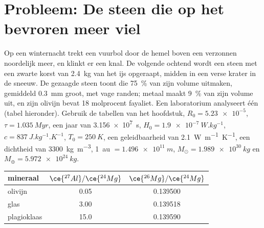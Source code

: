 \section{Probleem: De steen die op het bevroren meer viel}

\begin{problem}
\label{pb:b2:planet-formation-meteorites:1}
Op een winternacht trekt een vuurbol door de hemel boven een verzonnen noordelijk meer,
en klinkt er een knal. De volgende ochtend wordt een steen met een zwarte korst van \qty{2.4}{kg}
van het ijs opgeraapt, midden in een verse krater in de sneeuw. De gezaagde
steen toont  die \qty{75}{\percent} van zijn volume uitmaken, gemiddeld \qty{0.3}{mm}
groot, met vage randen; metaal maakt \qty{9}{\percent} van zijn
volume uit, en zijn olivijn bevat 18 molprocent fayaliet. Een laboratorium
analyseert één  (tabel hieronder). Gebruik de tabellen van het hoofdstuk,
$R_0 = \num{5.23e-5}$, $\tau = \qty{1.035}{Myr}$, een jaar van \qty{3.156e7}{s},
$H_0 = \qty{1.9e-7}{W.kg^{-1}}$, $c = \qty{837}{J.kg^{-1}.K^{-1}}$,
$T_0 = \qty{250}{K}$, een geleidbaarheid van \qty{2.1}{W.m^{-1}.K^{-1}}, een dichtheid van
\qty{3300}{kg.m^{-3}}, \qty{1}{au} $= \qty{1.496e11}{m}$,
$M_\odot = \qty{1.989e30}{kg}$ en $M_\oplus = \qty{5.972e24}{kg}$.

\begin{center}
\small
\begin{tabular}{lcc}
\hline
mineraal & $\ce{^{27}Al}/\ce{^{24}Mg}$ & $\ce{^{26}Mg}/\ce{^{24}Mg}$\\
\hline
olivijn & 0.05 & \num{0.139500}\\
glas & 3.00 & \num{0.139518}\\
plagioklaas & 15.0 & \num{0.139590}\\
\hline
\end{tabular}
\end{center}


\end{problem}
